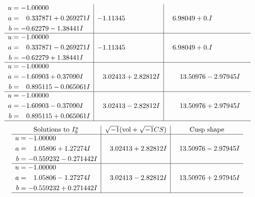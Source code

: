\documentclass[1p]{elsarticle_modified}
\theoremstyle{definition}
\newcommand{\I}{\sqrt{-1}}
\begin{document}
$$\begin{array}{c|c|c}
\begin{aligned}
u &= -1.00000\phantom{ +0.000000I} \\
a &= \phantom{-}0.337871 + 0.269271 I \\
b &= -0.62279 - 1.38441 I\end{aligned}
 & -1.11345\phantom{ +0.000000I} & \phantom{-}6.98049 + 0. I\phantom{ +0.000000I} \\ \hline\begin{aligned}
u &= -1.00000\phantom{ +0.000000I} \\
a &= \phantom{-}0.337871 - 0.269271 I \\
b &= -0.62279 + 1.38441 I\end{aligned}
 & -1.11345\phantom{ +0.000000I} & \phantom{-}6.98049 + 0. I\phantom{ +0.000000I} \\ \hline\begin{aligned}
u &= -1.00000\phantom{ +0.000000I} \\
a &= -1.60903 + 0.37090 I \\
b &= \phantom{-}0.895115 - 0.065061 I\end{aligned}
 & \phantom{-}3.02413 + 2.82812 I & \phantom{-}13.50976 - 2.97945 I \\ \hline\begin{aligned}
u &= -1.00000\phantom{ +0.000000I} \\
a &= -1.60903 - 0.37090 I \\
b &= \phantom{-}0.895115 + 0.065061 I\end{aligned}
 & \phantom{-}3.02413 - 2.82812 I & \phantom{-}13.50976 + 2.97945 I\\
 \hline 
 \end{array}$$\newpage$$\begin{array}{c|c|c}  
\text{Solutions to }I^u_{9}& \I (\text{vol} + \sqrt{-1}CS) & \text{Cusp shape}\\
 \hline 
\begin{aligned}
u &= -1.00000\phantom{ +0.000000I} \\
a &= \phantom{-}1.05806 + 1.27274 I \\
b &= -0.559232 - 0.271442 I\end{aligned}
 & \phantom{-}3.02413 + 2.82812 I & \phantom{-}13.50976 - 2.97945 I \\ \hline\begin{aligned}
u &= -1.00000\phantom{ +0.000000I} \\
a &= \phantom{-}1.05806 - 1.27274 I \\
b &= -0.559232 + 0.271442 I\end{aligned}
 & \phantom{-}3.02413 - 2.82812 I & \phantom{-}13.50976 + 2.97945 I\\
 \hline 
 \end{array}$$\newpage\newpage\renewcommand{\arraystretch}{1}
\end{document}
